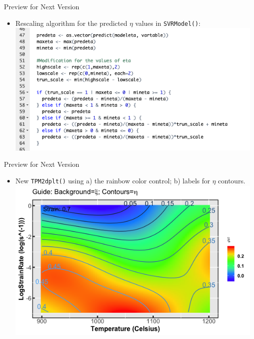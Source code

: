 \documentclass[11pt]{beamer}
\newcommand{\code}[1]{\texttt{#1}}
\begin{document}
\begin{frame}[t]{Preview for Next Version}
	\begin{minipage}[t]{1\textwidth}
        \vspace{0pt}
        \begin{itemize}
            \item {\small Rescaling algorithm for the predicted $\eta$ values in \code{SVRModel()}:}\\
            \singlespacing
            \includegraphics[scale=0.38]{Fig13.png}
        \end{itemize}
    \end{minipage}%
\end{frame}

\begin{frame}[t]{Preview for Next Version}
	\begin{minipage}[t]{1\textwidth}
        \vspace{0pt}
        \begin{itemize}
            \item {\small New \code{TPM2dplt()} using a) the rainbow color control; b) labels for $\eta$ contours.}\\
            \singlespacing
            \includegraphics[scale=0.38]{Fig14.png}
        \end{itemize}
    \end{minipage}%
\end{frame}
\end{document}
